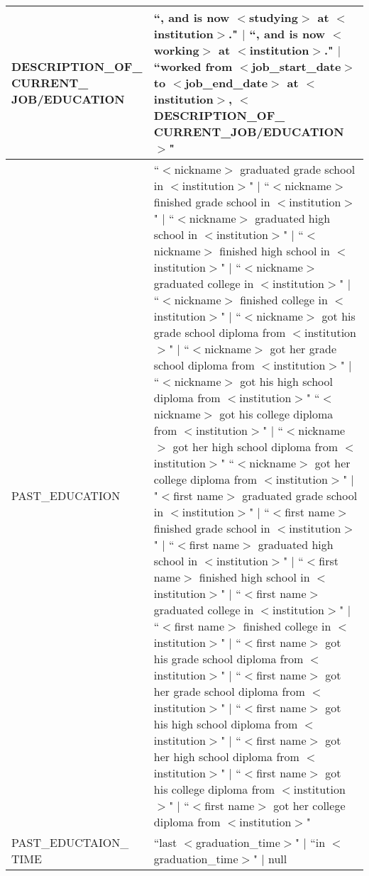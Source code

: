 \begin{longtable}{|p{1.5in}|p{4.5in}|}
DESCRIPTION\_OF\_ \newline CURRENT\_ \newline JOB/EDUCATION & ``, and is now $<$studying$>$ at $<$institution$>$." $|$ ``, and is now $<$working$>$ at $<$institution$>$." $|$  ``worked from $<$job\_start\_date$>$ to $<$job\_end\_date$>$ at $<$institution$>$, $<$DESCRIPTION\_OF\_ CURRENT\_JOB/EDUCATION$>$" \\ \hline
PAST\_EDUCATION & ``$<$nickname$>$ graduated grade school in $<$institution$>$" $|$ ``$<$nickname$>$ finished grade school in $<$institution$>$" $|$ ``$<$nickname$>$ graduated high school in $<$institution$>$"  $|$ ``$<$nickname$>$ finished high school in $<$institution$>$" $|$ ``$<$nickname$>$ graduated college in $<$institution$>$" $|$ ``$<$nickname$>$ finished college in $<$institution$>$" $|$ ``$<$nickname$>$ got his grade school diploma from $<$institution$>$" $|$ ``$<$nickname$>$ got her grade school diploma from $<$institution$>$" $|$ ``$<$nickname$>$ got his high school diploma from $<$institution$>$" ``$<$nickname$>$ got his college diploma from $<$institution$>$" $|$ ``$<$nickname$>$ got her high school diploma from $<$institution$>$" ``$<$nickname$>$ got her college diploma from $<$institution$>$" $|$ "$<$first name$>$ graduated grade school in $<$institution$>$" $|$ ``$<$first name$>$ finished grade school in $<$institution$>$" $|$ ``$<$first name$>$ graduated high school in $<$institution$>$" $|$ ``$<$first name$>$ finished high school in $<$institution$>$" $|$ ``$<$first name$>$ graduated college in $<$institution$>$" $|$ ``$<$first name$>$ finished college in $<$institution$>$" $|$ ``$<$first name$>$ got his grade school diploma from $<$institution$>$" $|$ ``$<$first name$>$ got her grade school diploma from $<$institution$>$" $|$ ``$<$first name$>$ got his high school diploma from $<$institution$>$" $|$ ``$<$first name$>$ got her high school diploma from $<$institution$>$" $|$ ``$<$first name$>$ got his college diploma from $<$institution$>$" $|$ ``$<$first name$>$ got her college diploma from $<$institution$>$" \\ \hline
PAST\_EDUCTAION\_ \newline TIME & ``last $<$graduation\_time$>$" $|$ ``in $<$graduation\_time$>$" $|$ null
\end{longtable}

